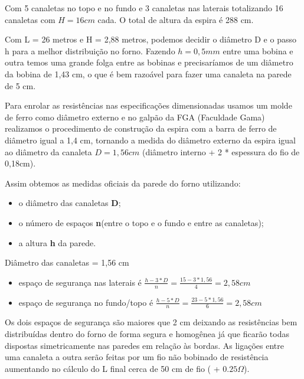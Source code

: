 Com 5 canaletas no topo e no fundo e 3 canaletas nas laterais totalizando 16 canaletas com $H=16 cm$ cada. O total de altura da espira é 288 cm.

Com L = 26 metros e H = 2,88 metros, podemos decidir o diâmetro D e o passo h para a melhor distribuição no forno. Fazendo $h = 0,5 mm$ entre uma bobina e outra temos uma grande folga entre as bobinas e precisaríamos de um diâmetro da bobina de 1,43 cm, o que é bem razoável para fazer uma canaleta na parede de 5 cm.

Para enrolar as resistências nas especificações dimensionadas usamos um molde de ferro como diâmetro externo e no galpão da FGA (Faculdade Gama) realizamos o procedimento de construção da espira com a barra de ferro de diâmetro igual a 1,4 cm, tornando a medida do diâmetro externo da espira igual ao diâmetro da canaleta $D = 1,56 cm$ (diâmetro interno + 2 * espessura do fio de 0,18cm).

Assim obtemos as medidas oficiais da parede do forno utilizando:
\begin{itemize}
	\item o diâmetro das canaletas \textbf{D};
	\item o número de espaços \textbf{n}(entre o topo e o fundo e entre as canaletas);
	\item a altura \textbf{h} da parede.
\end{itemize}

Diâmetro das canaletas = 1,56 cm
\begin{itemize}
	\item espaço de segurança nas laterais é $\frac{h-3*D}{n} = \frac{15 - 3 * 1,56}{4} = 2,58 cm$
	\item espaço de segurança no fundo/topo é $\frac{h-5*D}{n} = \frac{23 - 5 * 1,56}{6} = 2,58 cm$
\end{itemize}

Os dois espaços de segurança são maiores que 2 cm deixando as resistências bem distribuídas dentro do forno de forma segura e homogênea já que ficarão todas dispostas simetricamente nas paredes em relação às bordas.
As ligações entre uma canaleta a outra serão feitas por um fio não bobinado de resistência aumentando no cálculo do L final cerca de 50 cm de fio ( + $0.25\Omega$).

